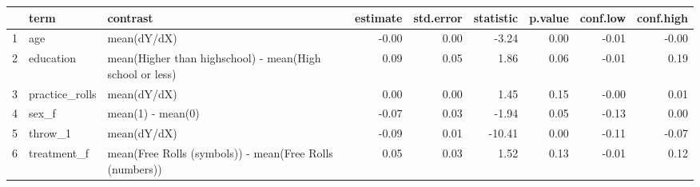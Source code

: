 \begin{table}[ht]
\centering
\begin{tabular}{rllrrrrrr}
  \hline
 & term & contrast & estimate & std.error & statistic & p.value & conf.low & conf.high \\ 
  \hline
1 & age & mean(dY/dX) & -0.00 & 0.00 & -3.24 & 0.00 & -0.01 & -0.00 \\ 
  2 & education & mean(Higher than highschool) - mean(High school or less) & 0.09 & 0.05 & 1.86 & 0.06 & -0.01 & 0.19 \\ 
  3 & practice\_rolls & mean(dY/dX) & 0.00 & 0.00 & 1.45 & 0.15 & -0.00 & 0.01 \\ 
  4 & sex\_f & mean(1) - mean(0) & -0.07 & 0.03 & -1.94 & 0.05 & -0.13 & 0.00 \\ 
  5 & throw\_1 & mean(dY/dX) & -0.09 & 0.01 & -10.41 & 0.00 & -0.11 & -0.07 \\ 
  6 & treatment\_f & mean(Free Rolls (symbols)) - mean(Free Rolls (numbers)) & 0.05 & 0.03 & 1.52 & 0.13 & -0.01 & 0.12 \\ 
   \hline
\end{tabular}
\end{table}
